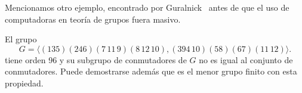 Mencionamos otro ejemplo, encontrado por Guralnick~\cite{MR673806} antes de que el uso de computadoras en teoría de grupos fuera masivo.

\begin{example}
El grupo 
\[
G=\langle (135)(246)(7\,11\,9)(8\,12\,10),(394\,10)(58)(67)(11\,12)\rangle.
\]
tiene orden 96 y su subgrupo de conmutadores de $G$ 
no es igual al conjunto de conmutadores. Puede demostrarse además que es el menor grupo finito con esta propiedad. 
\end{example}


